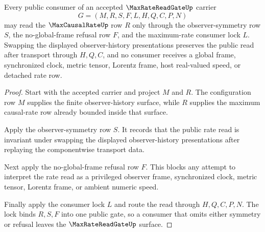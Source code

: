 \begin{theorem}
\label{thm:max-rate-read-gate-symmetry-nonescape}
Every public consumer of an accepted $\MaxRateReadGateUp$ carrier
$$
G=(M,R,S,F,L,H,Q,C,P,N)
$$
may read the $\MaxCausalRateUp$ row $R$ only through the observer-symmetry row $S$, the no-global-frame refusal row $F$, and the maximum-rate consumer lock $L$. Swapping the displayed observer-history presentations preserves the public read after transport through $H,Q,C$, and no consumer receives a global frame, synchronized clock, metric tensor, Lorentz frame, host real-valued speed, or detached rate row.
\end{theorem}
\begin{proof}
Start with the accepted carrier and project $M$ and $R$. The configuration row $M$ supplies the finite observer-history surface, while $R$ supplies the maximum causal-rate row already bounded inside that surface.

Apply the observer-symmetry row $S$. It records that the public rate read is invariant under swapping the displayed observer-history presentations after replaying the componentwise transport data.

Next apply the no-global-frame refusal row $F$. This blocks any attempt to interpret the rate read as a privileged observer frame, synchronized clock, metric tensor, Lorentz frame, or ambient numeric speed.

Finally apply the consumer lock $L$ and route the read through $H,Q,C,P,N$. The lock binds $R,S,F$ into one public gate, so a consumer that omits either symmetry or refusal leaves the $\MaxRateReadGateUp$ surface.
\end{proof}

